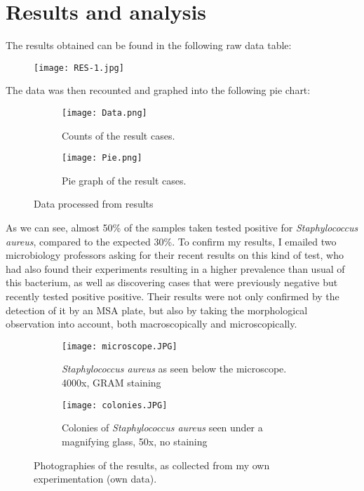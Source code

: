 \section{Results and analysis}
The results obtained can be found in the following raw data table:
\begin{center}\begin{figure}[H]\centering\texttt{[image: RES-1.jpg]}\end{figure}\end{center}
The data was then recounted and graphed into the following pie chart:
\begin{center}\begin{figure}[H]\centering\begin{subfigure}[b]{0.4\linewidth}\texttt{[image: Data.png]}\caption{Counts of the result cases.}\end{subfigure}\begin{subfigure}[b]{0.38\linewidth}\texttt{[image: Pie.png]}\caption{Pie graph of the result cases.}\end{subfigure}\caption{Data processed from results}\end{figure}\end{center}\vspace{-1.5em}
As we can see, almost 50\% of the samples taken tested positive for \emph{Staphylococcus aureus}, compared to the expected 30\%\cite{StaphylococcusAureusHealthcare2020}. To confirm my results, I emailed two microbiology professors asking for their recent results on this kind of test, who had also found their experiments resulting in a higher prevalence than usual of this bacterium, as well as discovering cases that were previously negative but recently tested positive positive. Their results were not only confirmed by the detection of it by an MSA plate, but also by taking the morphological observation into account, both macroscopically and microscopically.
\begin{figure}[H]\centering\begin{subfigure}[b]{0.4\linewidth}\texttt{[image: microscope.JPG]}\caption{\emph{Staphylococcus aureus} as seen below the microscope. 4000x, GRAM staining}\end{subfigure}\begin{subfigure}[b]{0.4\linewidth}\texttt{[image: colonies.JPG]}\caption{Colonies of \emph{Staphylococcus aureus} seen under a magnifying glass, 50x, no staining}\end{subfigure}\caption{Photographies of the results, as collected from my own experimentation (own data).}\end{figure}
